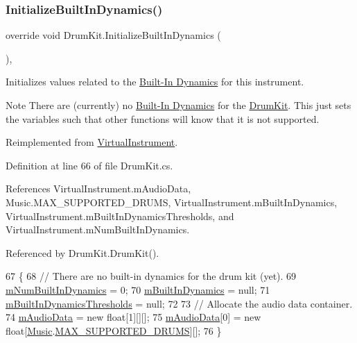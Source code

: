 \subsubsection{\texorpdfstring{Initialize\+Built\+In\+Dynamics()}{InitializeBuiltInDynamics()}}
{\footnotesize\ttfamily override void Drum\+Kit.\+Initialize\+Built\+In\+Dynamics (\begin{DoxyParamCaption}{ }\end{DoxyParamCaption})\hspace{0.3cm}{\ttfamily [protected]}, {\ttfamily [virtual]}}



Initializes values related to the \hyperlink{group___audio_DefBID}{Built-\/\+In Dynamics} for this instrument. 

\begin{DoxyNote}{Note}
There are (currently) no \hyperlink{group___audio_DefBID}{Built-\/\+In Dynamics} for the \hyperlink{class_drum_kit}{Drum\+Kit}. This just sets the variables such that other functions will know that it is not supported. 
\end{DoxyNote}


Reimplemented from \hyperlink{group___v_i_base_virt_func_ga995456c03ee54543b285188c51c29a07}{Virtual\+Instrument}.



Definition at line 66 of file Drum\+Kit.\+cs.



References Virtual\+Instrument.\+m\+Audio\+Data, Music.\+M\+A\+X\+\_\+\+S\+U\+P\+P\+O\+R\+T\+E\+D\+\_\+\+D\+R\+U\+MS, Virtual\+Instrument.\+m\+Built\+In\+Dynamics, Virtual\+Instrument.\+m\+Built\+In\+Dynamics\+Thresholds, and Virtual\+Instrument.\+m\+Num\+Built\+In\+Dynamics.



Referenced by Drum\+Kit.\+Drum\+Kit().


\begin{DoxyCode}
67     \{
68         \textcolor{comment}{// There are no built-in dynamics for the drum kit (yet).}
69         \hyperlink{group___v_i_base_pro_var_gac265f64f759d267ee1e1680f8d387011}{mNumBuiltInDynamics} = 0;
70         \hyperlink{group___v_i_base_pro_var_ga87961e72f25fbc2256b614a394aa6f13}{mBuiltInDynamics} = null;
71         \hyperlink{group___v_i_base_pro_var_gae3db4264dc2a96e99ea680c6d637e6bf}{mBuiltInDynamicsThresholds} = null;
72 
73         \textcolor{comment}{// Allocate the audio data container.}
74         \hyperlink{group___v_i_base_pro_var_ga52e76d9b74408660584676035a92a2c6}{mAudioData} = \textcolor{keyword}{new} \textcolor{keywordtype}{float}[1][][];
75         \hyperlink{group___v_i_base_pro_var_ga52e76d9b74408660584676035a92a2c6}{mAudioData}[0] = \textcolor{keyword}{new} \textcolor{keywordtype}{float}[\hyperlink{class_music}{Music}.\hyperlink{group___music_constants_gabce1a1ac5b9b6355af6bd7fb3868467a}{MAX\_SUPPORTED\_DRUMS}][];
76     \}
\end{DoxyCode}
